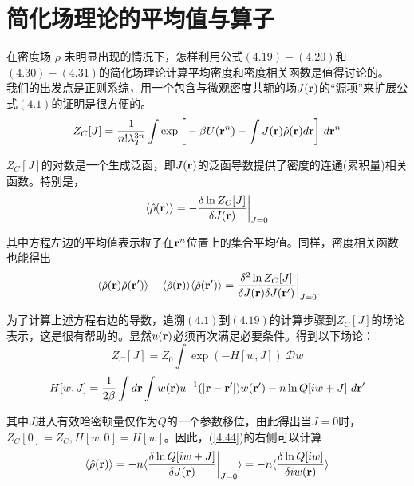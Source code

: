 \section{简化场理论的平均值与算子}

在密度场 $\rho $ 未明显出现的情况下，怎样利用公式$(4.19)-(4.20)$和$(4.30)-(4.31)$的简化场理论计算平均密度和密度相关函数是值得讨论的。\\

我们的出发点是正则系综，用一个包含与微观密度共轭的场$J(\mathbf{r})$的“源项”来扩展公式$(4.1)$的证明是很方便的。\\
\begin{equation}
Z_{C}[J]=\frac{1}{n! \lambda _{T}^{3n}} \int  \exp \bigg[-\beta U(\mathbf{r}^{n})- \int J(\mathbf{r}) \hat{ \rho }(\mathbf{r})d\mathbf{r} \bigg]~ d \mathbf{r}^{n}
\end{equation}

$Z_{C}[J]$的对数是一个生成泛函，即$J(\mathbf{r})$的泛函导数提供了密度的连通(累积量)相关函数。特别是，\\
\begin{equation}
\langle \hat{ \rho } (\mathbf{r}) \rangle = - \frac{\delta \ln Z_{C}[J] }{\delta J(\mathbf{r})} \bigg |_{J=0}
\label{4.44}
\end{equation}

其中方程左边的平均值表示粒子在$\mathbf{r}^{n}$位置上的集合平均值。同样，密度相关函数也能得出\\
\begin{equation}
\langle \hat{ \rho } (\mathbf{r}) \hat{ \rho } (\mathbf{r}')\rangle - \langle  \hat{ \rho } (\mathbf{r}) \rangle \langle  \hat{ \rho } (\mathbf{r}') \rangle = \frac{\delta ^{2} \ln Z_{C}[J]}{\delta J(\mathbf{r}) \delta J(\mathbf{r}')} \bigg |_{J=0}
\end{equation}

为了计算上述方程右边的导数，追溯$(4.1)$到$(4.19)$的计算步骤到$Z_{C}[J]$的场论表示，这是很有帮助的。显然$u(\mathbf{r})$必须再次满足必要条件。得到以下场论：\\
\begin{equation}
Z_{C}[J]=Z_{0} \int \exp (-H[w,J]) ~\mathcal{D} w 
\end{equation}
\begin{equation}
H[w ,J]=\frac{1}{2 \beta } \int d\mathbf{r} \int w (\mathbf{r}) u^{-1} (|\mathbf{r}-\mathbf{r}'|) w (\mathbf{r}') - n \ln Q[i w +J] ~d\mathbf{r}'
\end{equation}

其中$J$进入有效哈密顿量仅作为$Q$的一个参数移位，由此得出当$J=0$时，$Z_{C}[0]=Z_{C},H[ w,0]=H[ w ]$。因此，(\ref{4.44})的右侧可以计算\\
\begin{equation}
\langle \hat{ \rho } (\mathbf{r}) \rangle = - n \langle \frac{ \delta \ln Q[i w + J ]}{ \delta J(\mathbf{r}) } \bigg|_{J=0} \rangle = -n \langle \frac{\delta \ln Q[ i w]}{ \delta i w (\mathbf{r})} \rangle
\label{4.48}
\end{equation}

